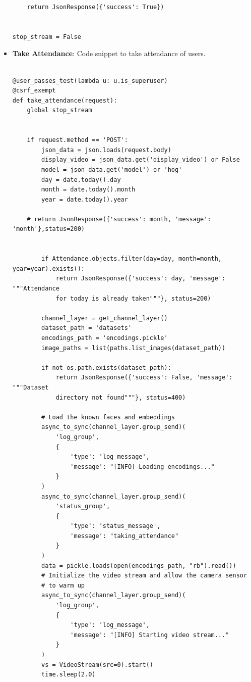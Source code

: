 \begin{itemize}
\begin{verbatim}
    return JsonResponse({'success': True})


stop_stream = False
\end{verbatim}

\item \textbf{Take Attendance}: Code snippet to take attendance of users.

\begin{verbatim}

@user_passes_test(lambda u: u.is_superuser)
@csrf_exempt
def take_attendance(request):
    global stop_stream


    if request.method == 'POST':
        json_data = json.loads(request.body)
        display_video = json_data.get('display_video') or False
        model = json_data.get('model') or 'hog'
        day = date.today().day
        month = date.today().month
        year = date.today().year
        
    # return JsonResponse({'success': month, 'message': 'month'},status=200)
         

        if Attendance.objects.filter(day=day, month=month, year=year).exists():
            return JsonResponse({'success': day, 'message': """Attendance 
            for today is already taken"""}, status=200)

        channel_layer = get_channel_layer()
        dataset_path = 'datasets'
        encodings_path = 'encodings.pickle'
        image_paths = list(paths.list_images(dataset_path))

        if not os.path.exists(dataset_path):
            return JsonResponse({'success': False, 'message': """Dataset 
            directory not found"""}, status=400)

        # Load the known faces and embeddings
        async_to_sync(channel_layer.group_send)(
            'log_group',
            {
                'type': 'log_message',
                'message': "[INFO] Loading encodings..."
            }
        )
        async_to_sync(channel_layer.group_send)(
            'status_group',
            {
                'type': 'status_message',
                'message': "taking_attendance"
            }
        )
        data = pickle.loads(open(encodings_path, "rb").read())
        # Initialize the video stream and allow the camera sensor
        # to warm up
        async_to_sync(channel_layer.group_send)(
            'log_group',
            {
                'type': 'log_message',
                'message': "[INFO] Starting video stream..."
            }
        )
        vs = VideoStream(src=0).start()
        time.sleep(2.0)


\end{verbatim}
\end{itemize}
